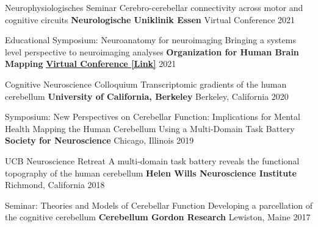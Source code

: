 \begin{cventries}

  \cventry
    {Neurophysiologisches Seminar} %
    {Cerebro-cerebellar connectivity across motor and cognitive circuits} %
    {\textbf{Neurologische Uniklinik Essen}} %
    {Virtual Conference} %
    {2021} %

  \cventry
    {Educational Symposium: Neuroanatomy for neuroimaging} %
    {Bringing a systems level perspective to neuroimaging analyses} %
    {\textbf{Organization for Human Brain Mapping}} %
    { \href{https://www.youtube.com/watch?v=L6nwkvBqJzI}{\textbf{Virtual Conference [Link]}}} %
    {2021} %
    
  \cventry
    {Cognitive Neuroscience Colloquium} %
    {Transcriptomic gradients of the human cerebellum} %
    {\textbf{University of California, Berkeley}} %
    {Berkeley, California} %
    {2020} %

  \cventry
    {Symposium: New Perspectives on Cerebellar Function: Implications for Mental Health} %
    {Mapping the Human Cerebellum Using a Multi-Domain Task Battery} %
    {\textbf{Society for Neuroscience}} %
    {Chicago, Illinois} %
    {2019} %
    
  \cventry
    {UCB Neuroscience Retreat} %
    {A multi-domain task battery reveals the functional topography of the human cerebellum} %
    {\textbf{Helen Wills Neuroscience Institute}}
    {Richmond, California} %
    {2018} %
    
  \cventry
    {Seminar: Theories and Models of Cerebellar Function} %
    {Developing a parcellation of the cognitive cerebellum} %
    {\textbf{Cerebellum Gordon Research}} %
    {Lewiston, Maine} %
    {2017} %
   
\end{cventries}



